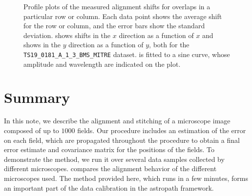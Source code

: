 \documentclass{article}
\begin{document}
\begin{figure}[ht]
\begin{subfigure}{0.49\linewidth}
		\caption{}
		\label{fig:sinewaveyyAKY}
	\end{subfigure}
	\caption{Profile plots of the measured alignment shifts for overlaps in a particular row or column.  Each data point shows the average shift for the row or column, and the error bars show the standard deviation.   shows shifts in the $x$ direction as a function of $x$ and  shows in the $y$ direction as a function of $y$, both for the \texttt{TS19\_0181\_A\_1\_3\_BMS\_MITRE} dataset.   is fitted to a sine curve, whose amplitude and wavelength are indicated on the plot.}
	\label{fig:sinewavesAKY}
\end{figure}

\clearpage

\section{Summary}

In this note, we describe the alignment and stitching of a microscope image composed of up to $1000$ fields.  Our procedure includes an estimation of the error on each field, which are propagated throughout the procedure to obtain a final error estimate and covariance matrix for the positions of the fields.  To demonstrate the method, we run it over several data samples collected by different microscopes.   compares the alignment behavior of the different microscopes used.  The method provided here, which runs in a few minutes, forms an important part of the data calibration in the astropath framework.

\end{document}
